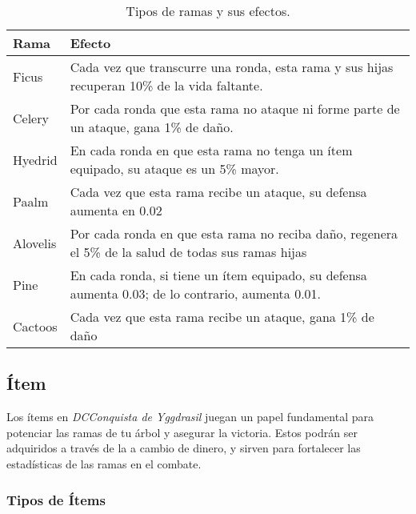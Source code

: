 \begin{table}[H]
\centering
\label{tab:ramas}
\begin{tabularx}{1\textwidth}{|l|X|}
\hline
\textbf{Rama} & \textbf{Efecto}                                                                                      \\ \hline
Ficus         & Cada vez que transcurre una ronda, esta rama y sus hijas recuperan 10\% de la vida faltante.         \\ \hline
Celery        & Por cada ronda que esta rama no ataque ni forme parte de un ataque, gana 1\% de daño.                \\ \hline
Hyedrid       & En cada ronda en que esta rama no tenga un ítem equipado, su ataque es un 5\% mayor.                 \\ \hline
Paalm         & Cada vez que esta rama recibe un ataque, su defensa aumenta en 0.02                                  \\ \hline
Alovelis      & Por cada ronda en que esta rama no reciba daño, regenera el 5\% de la salud de todas sus ramas hijas \\ \hline
Pine          & En cada ronda, si tiene un ítem equipado, su defensa aumenta 0.03; de lo contrario, aumenta 0.01.    \\ \hline
Cactoos       & Cada vez que esta rama recibe un ataque, gana 1\% de daño                                            \\ \hline
\end{tabularx}
\caption{Tipos de ramas y sus efectos.}
\end{table}

\subsection{Ítem} \label{subsec:Ítem}

Los ítems en \textit{DCConquista de Yggdrasil} juegan un papel fundamental para potenciar las ramas de tu árbol y asegurar la victoria. Estos podrán ser adquiridos a través de la  a cambio de dinero, y sirven para fortalecer las estadísticas de las ramas en el combate.


\subsubsection{Tipos de Ítems} \label{subsubsec:Tipos de Ítems}